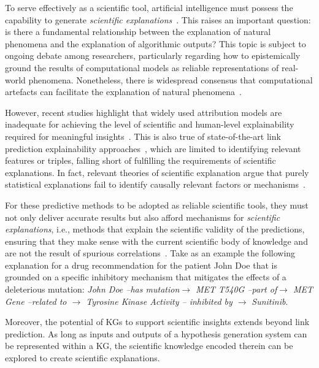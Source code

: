 \documentclass{article}
\theoremstyle{definition}
\begin{document}
To serve effectively as a scientific tool, artificial intelligence must possess the capability to generate \textit{scientific explanations}~\cite{duran2021dissecting}. This raises an important question: is there a fundamental relationship between the explanation of natural phenomena and the explanation of algorithmic outputs? This topic is subject to ongoing debate among researchers, particularly regarding how to epistemically ground the results of computational models as reliable representations of real-world phenomena. Nonetheless, there is widespread consensus that computational artefacts can facilitate the explanation of natural phenomena~\cite{duran2017varying,krohs2008digital,duran2021dissecting}.

However, recent studies highlight that widely used attribution models \cite{ribeiro2016should,lundberg2017unified} are inadequate for achieving the level of scientific and human-level explainability required for meaningful insights~\cite{chou2022counterfactuals}. This is also true of state-of-the-art link prediction explainability approaches~\cite{rossi2022kelpie,betz2022adversarial}, which are limited to identifying relevant features or triples, falling short of fulfilling the requirements of scientific explanations. In fact, relevant theories of scientific explanation argue that purely statistical explanations fail to identify causally relevant factors or mechanisms~\cite{salmon1984scientific}.

For these predictive methods to be adopted as reliable scientific tools, they must not only deliver accurate results but also afford mechanisms for \textit{scientific explanations}, i.e., methods that explain the scientific validity of the predictions, ensuring that they make sense with the current scientific body of knowledge and are not the result of spurious correlations~\cite{holzinger2019causability}. Take as an example the following explanation for a drug recommendation for the patient John Doe that is grounded on a specific inhibitory mechanism that mitigates the effects of a deleterious mutation:
   \textit{ \textit{John Doe} --has mutation$\rightarrow$ \textit{MET T540G} --part of$\rightarrow$  \textit{MET Gene} --related to $\rightarrow$  \textit{Tyrosine Kinase Activity} -- inhibited by $\rightarrow$ }\textit{Sunitinib}.


Moreover, the potential of KGs to support scientific insights extends beyond link prediction. As long as inputs and outputs of a hypothesis generation system can be represented within a KG, the scientific knowledge encoded therein can be explored to create scientific explanations. 
\end{document}
